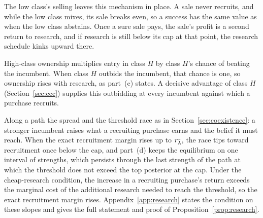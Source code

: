 The low class's selling leaves this mechanism in place. A sale never recruits, and while the low class mixes, its sale
breaks even, so a success has the same value as when the low class abstains. Once a sure sale pays, the sale's
profit is a second return to research, and if research is still below its cap at that point, the research schedule
kinks upward there.

High-class ownership multiplies entry in class \(H\) by class \(H\)'s chance of beating the incumbent. When class
\(H\) outbids the incumbent, that chance is one, so ownership rises with research, as part~(c) states. A decisive
advantage of class \(H\) (Section~\ref{sec:ccc}) supplies this outbidding at every incumbent against which a purchase
recruits.

Along a path the spread and the threshold race as in Section~\ref{sec:coexistence}: a stronger incumbent raises what
a recruiting purchase earns and the belief it must reach. When the exact recruitment margin rises up to
\(r_{\bar\lambda}\), the race tips toward recruitment once below the cap, and part~(d) keeps the
equilibrium on one interval of strengths, which persists through the last strength of the path at which the threshold
does not exceed the top posterior at the cap. Under the cheap-research condition, the increase in a recruiting
purchase's return exceeds the marginal cost of the additional research needed to reach the threshold, so the exact
recruitment margin rises. Appendix~\ref{app:research} states the condition on these slopes and gives the full
statement and proof of Proposition~\ref{prop:research}.

